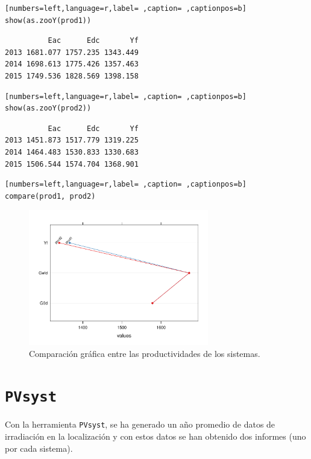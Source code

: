 \begin{lstlisting}[numbers=left,language=r,label= ,caption= ,captionpos=b]
show(as.zooY(prod1))
\end{lstlisting}

\begin{verbatim}
          Eac      Edc       Yf
2013 1681.077 1757.235 1343.449
2014 1698.613 1775.426 1357.463
2015 1749.536 1828.569 1398.158
\end{verbatim}


\begin{lstlisting}[numbers=left,language=r,label= ,caption= ,captionpos=b]
show(as.zooY(prod2))
\end{lstlisting}

\begin{verbatim}
          Eac      Edc       Yf
2013 1451.873 1517.779 1319.225
2014 1464.483 1530.833 1330.683
2015 1506.544 1574.704 1368.901
\end{verbatim}


\begin{lstlisting}[numbers=left,language=r,label= ,caption= ,captionpos=b]
compare(prod1, prod2)
\end{lstlisting}

\begin{figure}[htbp]
\centering
\includegraphics[width=0.7\textwidth]{figuras/ejemplos2.pdf}
\caption{Comparación gráfica entre las productividades de los sistemas.}
\end{figure}


\section{\texttt{PVsyst}}
\label{sec:org16d74a6}
Con la herramienta \texttt{PVsyst}, se ha generado un año promedio de datos de irradiación en la localización y con estos datos se han obtenido dos informes (uno por cada sistema).

